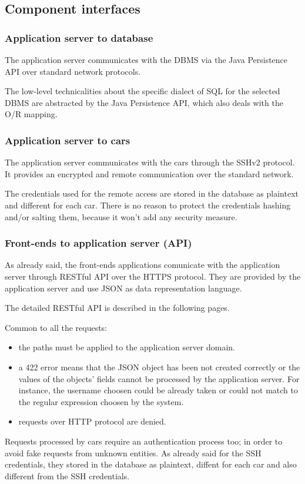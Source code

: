 \subsection{Component interfaces}

\subsubsection{Application server to database}

The application server communicates with the DBMS via the Java Persistence API over standard network protocols.

The low-level technicalities about the specific dialect of SQL for the selected DBMS are abstracted by the Java Persistence API, which also deals with the O/R mapping.

\subsubsection{Application server to cars}

The application server communicates with the cars through the SSHv2 protocol. It provides an encrypted and remote communication over the standard network.

The credentials used for the remote access are stored in the database as plaintext and different for each car. There is no reason to protect the credentials hashing and/or salting them, because it won't add any security measure.

\subsubsection{Front-ends to application server (API)}

As already said, the front-ends applications comunicate with the application server through RESTful API over the HTTPS protocol. They are provided by the application server and use JSON as data representation language.

The detailed RESTful API is described in the following pages. 

\bigskip

\noindent Common to all the requests:
\begin{itemize}
	\item the paths must be applied to the application server domain.
	\item a 422 error means that the JSON object has been not created correctly or the values of the objects' fields cannot be processed by the application server. For instance, the username choosen could be already taken or could not match to the regular expression choosen by the system.
	\item requests over HTTP protocol are denied.
\end{itemize}
Requests processed by cars require an authentication process too; in order to avoid fake requests from unknown entities. As already said for the SSH credentials, they stored in the database as plaintext, diffent for each car and also different from the SSH credentials.




